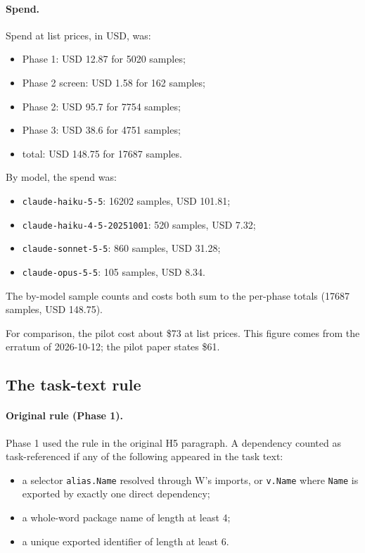 \documentclass[10pt]{article}
\begin{document}
\paragraph{Spend.} Spend at list prices, in USD, was:
\begin{itemize}
\item Phase 1: USD 12.87 for 5020 samples;
\item Phase 2 screen: USD 1.58 for 162 samples;
\item Phase 2: USD 95.7 for 7754 samples;
\item Phase 3: USD 38.6 for 4751 samples;
\item total: USD 148.75 for 17687 samples.
\end{itemize}

By model, the spend was:
\begin{itemize}
\item \texttt{claude-haiku-5-5}: 16202 samples, USD 101.81;
\item \texttt{claude-haiku-4-5-20251001}: 520 samples, USD 7.32;
\item \texttt{claude-sonnet-5-5}: 860 samples, USD 31.28;
\item \texttt{claude-opus-5-5}: 105 samples, USD 8.34.
\end{itemize}

The by-model sample counts and costs both sum to the per-phase totals (17687 samples, USD 148.75).

For comparison, the pilot cost about \$73 at list prices. This figure comes from the erratum of 2026-10-12; the pilot paper states \$61.

\subsection{The task-text rule}\label{sec:taskrule}

\paragraph{Original rule (Phase 1).} Phase 1 used the rule in the original H5 paragraph. A dependency counted as task-referenced if any of the following appeared in the task text:
\begin{itemize}
\item a selector \texttt{alias.Name} resolved through W's imports, or \texttt{v.Name} where \texttt{Name} is exported by exactly one direct dependency;
\item a whole-word package name of length at least 4;
\item a unique exported identifier of length at least 6.
\end{itemize}
\end{document}
